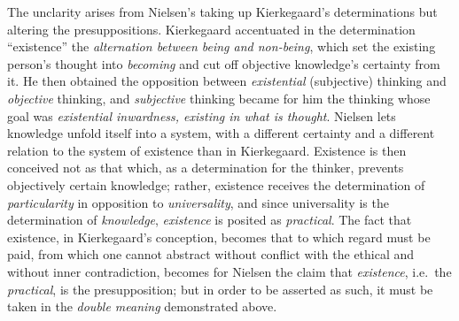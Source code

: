 \documentclass[12pt,a4paper]{book}
\begin{document}
The unclarity arises from Nielsen's taking up Kierkegaard's
determinations but altering the presuppositions. Kierkegaard accentuated
in the determination ``existence'' the \emph{alternation between being and
non-being}, which set the existing person's thought into \emph{becoming} and cut
off objective knowledge's certainty from it. He then obtained the
opposition between \emph{existential} (subjective) thinking and \emph{objective}
thinking, and \emph{subjective} thinking became for him the thinking whose goal
was \emph{existential inwardness, existing in what is thought}. Nielsen lets
knowledge unfold itself into a system, with a different certainty and a
different relation to the system of existence than in Kierkegaard.
Existence is then conceived not as that which, as a determination for
the thinker, prevents objectively certain knowledge; rather, existence
receives the determination of \emph{particularity} in opposition to
\emph{universality}, and since universality is the determination of \emph{knowledge},
\emph{existence} is posited as \emph{practical}. The fact that existence, in
Kierkegaard's conception, becomes that to which regard must be paid,
from which one cannot abstract without conflict with the ethical and
without inner contradiction, becomes for Nielsen the claim that
\emph{existence}, i.e.\ the \emph{practical}, is the presupposition; but in order to
be asserted as such, it must be taken in the \emph{double meaning} demonstrated
above.
\end{document}

